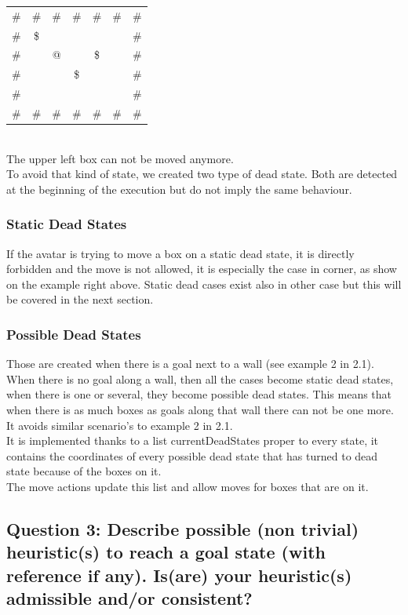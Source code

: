 \documentclass[a4paper,10pt]{article}
\begin{document}
	\begin{tabular}{ccccccc}
		\# & \# & \# & \# & \# & \# & \# \\ 
		\# & \$ &    &    &    &    & \# \\ 
		\# &    & @  &    & \$ &    & \# \\ 
		\# &    &    & \$ &    &    & \# \\ 
		\# &    &    &    &    &    & \# \\
		\# & \# & \# & \# & \# & \# & \# \\ 
	\end{tabular}\\ 
	
			The upper left box can not be moved anymore.\\
			To avoid that kind of state, we created two type of dead state. Both are detected at the beginning of the execution but do not imply the same behaviour.
			
			\subsubsection{Static Dead States}
				If the avatar is trying to move a box on a static dead state, it is directly forbidden and the move is not allowed, it is especially the case in corner, as show on the example right above.
				Static dead cases exist also in other case but this will be covered in the next section.
				
			\subsubsection{Possible Dead States}
				Those are created when there is a goal next to a wall (see example 2 in 2.1). When there is no goal along a wall, then all the cases become static dead states, when there is one or several, they become possible dead states. This means that when there is as much boxes as goals along that wall there can not be one more. It avoids similar scenario's to example 2 in 2.1.\\
				It is implemented thanks to a list currentDeadStates proper to every state, it contains the coordinates of every possible dead state that has turned to dead state because of the boxes on it.\\
				The move actions update this list and allow moves for boxes that are on it.				
				
		\subsection{Question 3: Describe possible (non trivial) heuristic(s) to reach a goal state (with reference if any). Is(are) your heuristic(s) admissible and/or consistent?}
\end{document}
